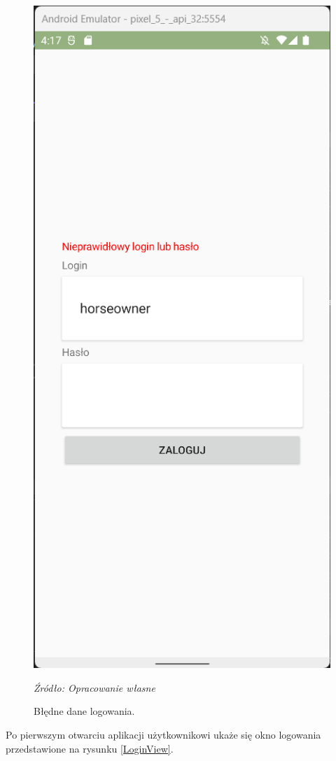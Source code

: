 \documentclass[12pt,oneside]{report}
\begin{document}
\begin{figure}
		\centering
	\includegraphics[scale=0.35]{WrongLoginData}
	\caption{\centering Błędne dane logowania.}
	\textit{\centering Źródło: Opracowanie własne}
	\label{LoginViewWrongPassword}
\end{figure}
Po pierwszym otwarciu aplikacji użytkownikowi ukaże się okno logowania przedstawione na rysunku \ref{LoginView}. 
\end{document}
